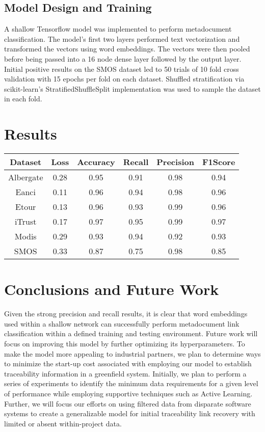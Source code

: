 \documentclass{article}
\begin{document}
\subsection{Model Design and Training}
    A shallow Tensorflow\citep{abadi2016tensorflow} model was implemented to perform metadocument classification. The model's first two layers performed text vectorization and transformed the vectors using word embeddings. The vectors were then pooled before being passed into a 16 node dense layer followed by the output layer. Initial positive results on the SMOS dataset led to 50 trials of 10 fold cross validation with 15 epochs per fold on each dataset. Shuffled stratification via scikit-learn's\citep{sklearn_api} StratifiedShuffleSplit implementation was used to sample the dataset in each fold. 

\section{Results}
    \begin{center}
        \begin{tabular}{ |c|c|c|c|c|c| } 
         \hline
         \textbf{Dataset} & \textbf{Loss} & \textbf{Accuracy} & \textbf{Recall} & \textbf{Precision} & \textbf{F1Score} \\ 
         \hline
         Albergate & 0.28 & 0.95 & 0.91 & 0.98 & 0.94 \\ 
         \hline
         Eanci & 0.11 & 0.96 & 0.94 & 0.98 & 0.96 \\ 
         \hline
         Etour & 0.13 & 0.96 & 0.93 & 0.99 & 0.96 \\ 
         \hline
         iTrust & 0.17 & 0.97 & 0.95 & 0.99 & 0.97 \\ 
         \hline
         Modis & 0.29 & 0.93 & 0.94 & 0.92 & 0.93 \\ 
         \hline
         SMOS & 0.33 & 0.87 & 0.75 & 0.98 & 0.85 \\ 
         \hline
        \end{tabular}
    \end{center}
    
\section{Conclusions and Future Work}
    Given the strong precision and recall results, it is clear that word embeddings used within a shallow network can successfully perform metadocument link classification within a defined training and testing environment. Future work will focus on improving this model by further optimizing its hyperparameters. To make the model more appealing to industrial partners, we plan to determine ways to minimize the start-up cost associated with employing our model to establish traceability information in a greenfield system. Initially, we plan to perform a series of experiments to identify the minimum data requirements for a given level of performance while employing supportive techniques such as Active Learning.  Further, we will focus our efforts on using filtered data from disparate software systems to create a generalizable model for initial traceability link recovery with limited or absent within-project data. 
    
\newpage



\end{document}
